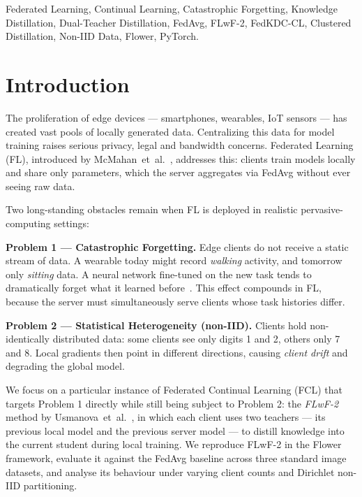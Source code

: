 \documentclass[journal]{IEEEtran}
\begin{document}
\begin{IEEEkeywords}
Federated Learning, Continual Learning, Catastrophic Forgetting,
Knowledge Distillation, Dual-Teacher Distillation, FedAvg, FLwF-2,
FedKDC-CL, Clustered Distillation, Non-IID Data, Flower, PyTorch.
\end{IEEEkeywords}

\section{Introduction}
\label{sec:intro}

The proliferation of edge devices --- smartphones, wearables, IoT
sensors --- has created vast pools of locally generated data.
Centralizing this data for model training raises serious privacy,
legal and bandwidth concerns. Federated Learning (FL), introduced by
McMahan~et~al.~\cite{fedavg}, addresses this: clients train models
locally and share only parameters, which the server aggregates via
FedAvg without ever seeing raw data.

Two long-standing obstacles remain when FL is deployed in realistic
pervasive-computing settings:

\textbf{Problem 1 --- Catastrophic Forgetting.} Edge clients do not
receive a static stream of data. A wearable today might record
\textit{walking} activity, and tomorrow only \textit{sitting} data.
A neural network fine-tuned on the new task tends to dramatically
forget what it learned before~\cite{forgetting}. This effect compounds
in FL, because the server must simultaneously serve clients whose task
histories differ.

\textbf{Problem 2 --- Statistical Heterogeneity (non-IID).} Clients
hold non-identically distributed data: some clients see only digits
1 and 2, others only 7 and 8. Local gradients then point in different
directions, causing \textit{client drift} and degrading the global
model.

We focus on a particular instance of Federated Continual Learning
(FCL) that targets Problem 1 directly while still being subject to
Problem 2: the \emph{FLwF-2} method by Usmanova~et~al.~\cite{flwf},
in which each client uses two teachers --- its previous local model
and the previous server model --- to distill knowledge into the
current student during local training. We reproduce FLwF-2 in the
Flower framework, evaluate it against the FedAvg baseline across three
standard image datasets, and analyse its behaviour under varying
client counts and Dirichlet non-IID partitioning.
\end{document}
